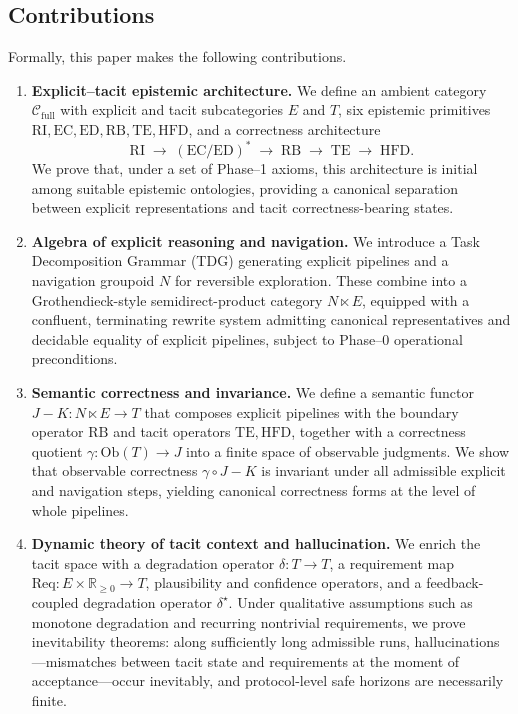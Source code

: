 \documentclass[11pt]{article}
\theoremstyle{definition}
\begin{document}
\subsection{Contributions}

Formally, this paper makes the following contributions.

\begin{enumerate}
  \item \textbf{Explicit–tacit epistemic architecture.}
  We define an ambient category $\mathcal{C}_{\mathrm{full}}$ with explicit and tacit subcategories $E$ and $T$, six epistemic primitives $\mathrm{RI}, \mathrm{EC}, \mathrm{ED}, \mathrm{RB}, \mathrm{TE}, \mathrm{HFD}$, and a correctness architecture
  \[
    \mathrm{RI} \;\rightarrow\; (\mathrm{EC}/\mathrm{ED})^{\ast} \;\rightarrow\; \mathrm{RB} \;\rightarrow\; \mathrm{TE} \;\rightarrow\; \mathrm{HFD}.
  \]
  We prove that, under a set of Phase–1 axioms, this architecture is initial among suitable epistemic ontologies, providing a canonical separation between explicit representations and tacit correctness-bearing states.

  \item \textbf{Algebra of explicit reasoning and navigation.}
  We introduce a Task Decomposition Grammar (TDG) generating explicit pipelines and a navigation groupoid $N$ for reversible exploration. These combine into a Grothendieck-style semidirect-product category $N \ltimes E$, equipped with a confluent, terminating rewrite system admitting canonical representatives and decidable equality of explicit pipelines, subject to Phase–0 operational preconditions.

  \item \textbf{Semantic correctness and invariance.}
  We define a semantic functor $J{-}K : N \ltimes E \to T$ that composes explicit pipelines with the boundary operator $\mathrm{RB}$ and tacit operators $\mathrm{TE}, \mathrm{HFD}$, together with a correctness quotient $\gamma : \mathrm{Ob}(T) \to J$ into a finite space of observable judgments. We show that observable correctness $\gamma \circ J{-}K$ is invariant under all admissible explicit and navigation steps, yielding canonical correctness forms at the level of whole pipelines.

  \item \textbf{Dynamic theory of tacit context and hallucination.}
  We enrich the tacit space with a degradation operator $\delta : T \to T$, a requirement map $\mathrm{Req} : E \times \mathbb{R}_{\ge 0} \to T$, plausibility and confidence operators, and a feedback-coupled degradation operator $\delta^{\star}$. Under qualitative assumptions such as monotone degradation and recurring nontrivial requirements, we prove inevitability theorems: along sufficiently long admissible runs, hallucinations—mismatches between tacit state and requirements at the moment of acceptance—occur inevitably, and protocol-level safe horizons are necessarily finite.


\end{enumerate}
\end{document}

